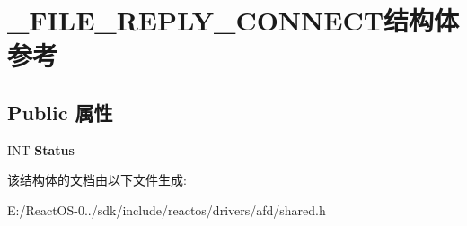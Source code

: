 \hypertarget{struct___f_i_l_e___r_e_p_l_y___c_o_n_n_e_c_t}{}\section{\+\_\+\+F\+I\+L\+E\+\_\+\+R\+E\+P\+L\+Y\+\_\+\+C\+O\+N\+N\+E\+C\+T结构体 参考}
\label{struct___f_i_l_e___r_e_p_l_y___c_o_n_n_e_c_t}
\subsection*{Public 属性}
\begin{DoxyCompactItemize}
\item 
\mbox{\label{struct___f_i_l_e___r_e_p_l_y___c_o_n_n_e_c_t_ad02b6decde286cd321681f8de440a6da}} 
I\+NT {\bfseries Status}
\end{DoxyCompactItemize}


该结构体的文档由以下文件生成\+:\begin{DoxyCompactItemize}
\item 
E\+:/\+React\+O\+S-\/0../sdk/include/reactos/drivers/afd/shared.\+h\end{DoxyCompactItemize}
